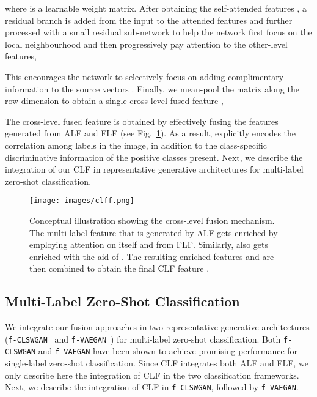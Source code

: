 \documentclass[10pt,journal,compsoc]{IEEEtran}
\newcommand{\clswgan}{\texttt{f-CLSWGAN}}
\newcommand{\vaegan}{\texttt{f-VAEGAN}}
\begin{document}
where  is a learnable weight matrix. 
After obtaining the self-attended features , a residual branch is added from the input to the attended features  and further processed with a small residual sub-network  to help the network first focus on the local neighbourhood and then progressively pay attention to the other-level features, 

This encourages the network to selectively focus on adding complimentary information to the source vectors . 
Finally, we mean-pool the matrix  along the row dimension to obtain a single cross-level fused feature , 

The cross-level fused feature  is obtained by effectively fusing the features generated from ALF and FLF (see Fig.~\ref{fig:clff_conceptual}). As a result,  explicitly encodes the correlation among labels in the image, in addition to the class-specific discriminative information of the positive classes present. Next, we describe the integration of our CLF in representative generative architectures for multi-label zero-shot classification.






\begin{figure}
  \centering
  \begin{minipage}[c]{0.4\columnwidth}
    \texttt{[image: images/clff.png]}
  \end{minipage}\quad
  \begin{minipage}[c]{0.5\columnwidth}
    \caption{Conceptual illustration showing the cross-level fusion mechanism. The multi-label feature  that is generated by ALF gets enriched by employing attention on itself and  from FLF. Similarly,  also gets enriched with the aid of . The resulting enriched features  and  are then combined to obtain the final CLF feature .}
    \label{fig:clff_conceptual}
  \end{minipage}
\end{figure}


\subsection{Multi-Label Zero-Shot Classification\label{sec:feat_syn}}
We integrate our fusion approaches in two representative generative architectures (\clswgan{}~\cite{xian2018feature} and \vaegan{}~\cite{xian2019f}) for  multi-label zero-shot classification. Both \clswgan{} and \vaegan{} have been shown to achieve promising performance for single-label zero-shot classification. Since CLF integrates both ALF and FLF, we only describe here the integration of CLF in the two classification frameworks. Next, we describe the integration of CLF in \clswgan{}, followed by \vaegan{}.
\end{document}
